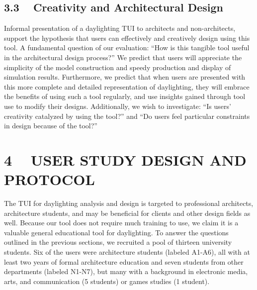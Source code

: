 \documentclass{article}
\begin{document}
\subsection{3.3 ~ Creativity and Architectural Design }

Informal presentation of a daylighting TUI to architects and
non-architects, support the hypothesis that users can effectively and
creatively design using this tool.  A fundamental question of our
evaluation: ``How is this tangible tool useful in the architectural
design process?''  We predict that users will appreciate the
simplicity of the model construction and speedy production and display
of simulation results.  Furthermore, we predict that when users are
presented with this more complete and detailed representation of
daylighting, they will embrace the benefits of using such a tool
regularly, and use insights gained through tool use to modify their
designs.  %
Additionally, we wish to investigate: ``Is users' creativity catalyzed
by using the tool?'' and ``Do users feel particular constraints in design
because of the tool?''  


\section{4 ~ USER STUDY DESIGN AND PROTOCOL}


The TUI for daylighting analysis and design is targeted to
professional architects, architecture students, and may be beneficial
for clients and other design fields as well.  Because our tool does
not require much training to use, we claim it is a valuable general
educational tool for daylighting.  To answer the questions outlined in
the previous sections, we recruited a pool of thirteen university
students.  Six of the users were architecture students (labeled
A1-A6), all with at least two years of formal architecture education
and seven students from other departments (labeled N1-N7), but many
with a background in electronic media, arts, and communication (5
students) or games studies (1 student).
\end{document}
